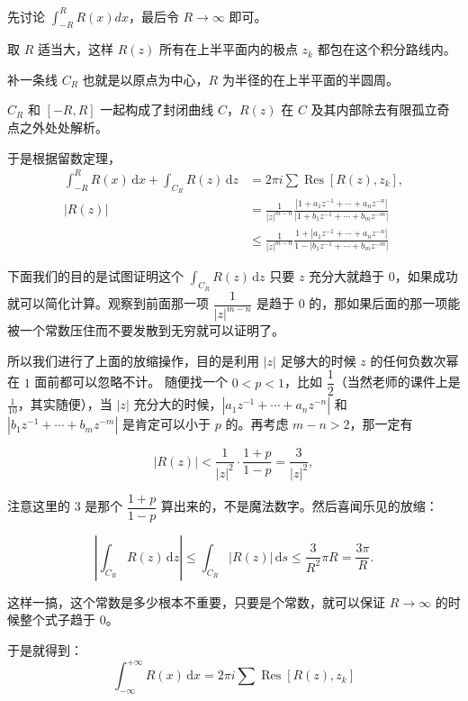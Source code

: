 先讨论 \(\int_{-R}^R R(x)dx\)，最后令 \(R\to \infty\) 即可。

取 \(R\) 适当大，这样 \(R(z)\) 所有在上半平面内的极点 \(z_k\)
都包在这个积分路线内。

补一条线 \(C_R\) 也就是以原点为中心，\(R\) 为半径的在上半平面的半圆周。

\(C_R\) 和 \([-R,R]\) 一起构成了封闭曲线 \(C\)，\(R(z)\) 在 \(C\)
及其内部除去有限孤立奇点之外处处解析。

于是根据留数定理，
\begin{align*}
\int _{-R}^{R} R(x)\,\mathrm{d}x + \int _{C_R} R(z)\,\mathrm{d}z &= 2\pi i \sum \operatorname{Res}[R(z),z_k], \\
\left|R(z)\right| &= \frac{1}{|z|^{m-n}}\frac{\left|1 + a_1z^{-1} + \cdots + a_nz^{-n}\right|}{\left|1 + b_1z^{-1} + \cdots + b_mz^{-m}\right|}\\
 &\le \frac{1}{|z|^{m-n}}\frac{1 + \left|a_1z^{-1} + \cdots + a_nz^{-n}\right|}{1 - \left|b_1z^{-1} + \cdots + b_mz^{-m}\right|}
\end{align*}

下面我们的目的是试图证明这个 \(\int _{C_R} R(z)\,\mathrm{d}z\) 只要
\(z\) 充分大就趋于 \(0\)，如果成功就可以简化计算。观察到前面那一项
\(\dfrac{1}{|z|^{m-n}}\) 是趋于 \(0\)
的，那如果后面的那一项能被一个常数压住而不要发散到无穷就可以证明了。

所以我们进行了上面的放缩操作，目的是利用 \(|z|\) 足够大的时候 \(z\)
的任何负数次幂在 \(1\) 面前都可以忽略不计。 随便找一个
\(0 < p < 1\)，比如 \(\dfrac{1}{2}\)（当然老师的课件上是
\(\frac{1}{10}\)，其实随便），当 \(|z|\)
充分大的时候，\(\left|a_1z^{-1} + \cdots + a_nz^{-n}\right|\) 和
\(\left|b_1z^{-1} + \cdots + b_mz^{-m}\right|\) 是肯定可以小于 \(p\)
的。再考虑 \(m-n > 2\)，那一定有

\begin{equation*}
|R(z)| < \frac{1}{|z|^2} \cdot \frac{1+p}{1-p} = \frac{3}{|z|^2},
\end{equation*}

注意这里的 \(3\) 是那个 \(\dfrac{1+p}{1-p}\)
算出来的，不是魔法数字。然后喜闻乐见的放缩：

\[
\left|\int_{C_R} R(z)\,\mathrm{d}z \right| \le \int _{C_R} |R(z)|\,\mathrm{d}s \le \frac{3}{R^2} \pi R = \frac{3\pi}{R}.
\]

这样一搞，这个常数是多少根本不重要，只要是个常数，就可以保证
\(R \to \infty\) 的时候整个式子趋于 \(0\)。

于是就得到：
\[
\boxed{
    \int_{-\infty}^{+\infty}R(x)\,\mathrm{d}x=2\pi i \sum \operatorname{Res}[R(z),z_k]
}
\]
